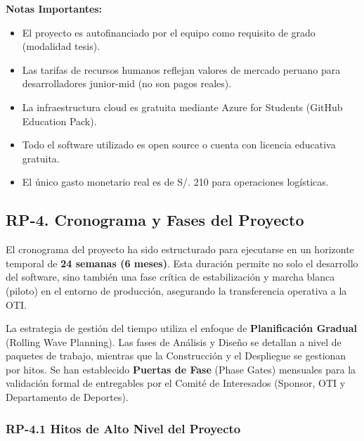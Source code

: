 \documentclass[12pt,a4paper]{article}
\begin{document}
\textbf{Notas Importantes:}
\begin{itemize}[noitemsep]
    \item El proyecto es autofinanciado por el equipo como requisito de grado (modalidad tesis).
    \item Las tarifas de recursos humanos reflejan valores de mercado peruano para desarrolladores junior-mid (no son pagos reales).
    \item La infraestructura cloud es gratuita mediante Azure for Students (GitHub Education Pack).
    \item Todo el software utilizado es open source o cuenta con licencia educativa gratuita.
    \item El único gasto monetario real es de S/. 210 para operaciones logísticas.
\end{itemize}

\subsection{RP-4. Cronograma y Fases del Proyecto}

El cronograma del proyecto ha sido estructurado para ejecutarse en un horizonte temporal de \textbf{24 semanas (6 meses)}. Esta duración permite no solo el desarrollo del software, sino también una fase crítica de estabilización y marcha blanca (piloto) en el entorno de producción, asegurando la transferencia operativa a la OTI.

La estrategia de gestión del tiempo utiliza el enfoque de \textbf{Planificación Gradual} (Rolling Wave Planning). Las fases de Análisis y Diseño se detallan a nivel de paquetes de trabajo, mientras que la Construcción y el Despliegue se gestionan por hitos. Se han establecido \textbf{Puertas de Fase} (Phase Gates) mensuales para la validación formal de entregables por el Comité de Interesados (Sponsor, OTI y Departamento de Deportes).

\subsubsection{RP-4.1 Hitos de Alto Nivel del Proyecto}
\end{document}
